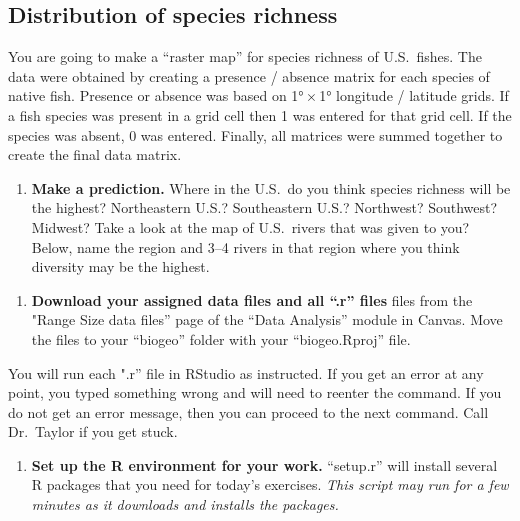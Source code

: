 \documentclass[11pt]{article}
\newcommand*{\assignmentTitle}{Distribution of species richness}
\begin{document}
\thispagestyle{first_page}

\subsection*{\assignmentTitle}

You are going to make a “raster map” for species richness of U.S.~fishes. The data were
obtained by creating a presence / absence matrix for each species of
native fish. Presence or absence was based on 1°\,$\times$\,1° longitude /
latitude grids. If a fish species was present in a grid cell then 1 was
entered for that grid cell. If the species was absent, 0 was entered. Finally, all matrices were summed together to create
the final data matrix.

\begin{enumerate}%
\item \textbf{Make a prediction.} Where in the U.S.~do you think species richness will be the highest? Northeastern U.S.? Southeastern
U.S.? Northwest? Southwest? Midwest? Take a look at the map of U.S.~rivers that was given to you?  Below, name the region and 3--4 rivers in that 
region where you think diversity may be the highest.\vspace{10\baselineskip}
\end{enumerate}

\begin{enumerate}[resume]
\item \textbf{Download your
 assigned data files and all ``.r'' files} files from the "Range Size data files” page of the “Data Analysis” module in Canvas. Move the files to your “biogeo” folder with your “biogeo.Rproj” file.
\end{enumerate}

You will run each ".r” file in RStudio as instructed. If you get an error at
any point, you typed something wrong and will need to reenter the
command. If you do not get an error message, then you can proceed to the
next command. Call Dr.~Taylor if you get stuck.


\begin{enumerate}[resume]
\item \textbf{Set up the R environment for your work.} “setup.r” will install several R packages that you need for today's exercises. \textit{This script may run for a few minutes as it downloads and installs the packages.}
\end{enumerate}
\end{document}

